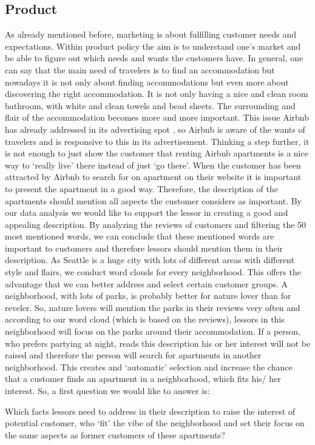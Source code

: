 \documentclass[journal]{IEEEtran}
\begin{document}
\subsection{Product}
\noindent As already mentioned before, marketing is about fulfilling customer needs and expectations. Within product policy the aim is to understand one’s market and be able to figure out which needs and wants the customers have. In general, one can say that the main need of travelers is to find an accommodation but nowadays it is not only about finding accommodations but even more about discovering the right accommodation. It is not only having a nice and clean room bathroom, with white and clean towels and bead sheets. The surrounding and flair of the accommodation becomes more and more important. This issue Airbnb has already addressed in its advertising spot \cite{RN6}, so Airbnb is aware of the wants of travelers and is responsive to this in its advertisement. Thinking a step further, it is not enough to just show the customer that renting Airbnb apartments is a nice way to ‘really live’ there instead of just ‘go there’. When the customer has been attracted by Airbnb to search for on apartment on their website it is important to present the apartment in a good way. Therefore, the description of the apartments should mention all aspects the customer considers as important. By our data analysis we would like to support the lessor in creating a good and appealing description. By analyzing the reviews of customers and filtering the 50 most mentioned words, we can conclude that these mentioned words are important to customers and therefore lessors should mention them in their description. As Seattle is a huge city with lots of different areas with different style and flairs, we conduct word clouds for every neighborhood. This offers the advantage that we can better address and select certain customer groups. A neighborhood, with lots of parks, is probably better for nature lover than for reveler. So, nature lovers will mention the parks in their reviews very often and according to our word cloud (which is based on the reviews), lessors in this neighborhood will focus on the parks around their accommodation. If a person, who prefers partying at night, reads this description his or her interest will not be raised and therefore the person will search for apartments in another neighborhood. This creates and ‘automatic’ selection and increase the chance that a customer finds an apartment in a neighborhood, which fits his/ her interest. So, a first question we would like to answer is: \begin{itshape}Which facts lessors need to address in their description to raise the interest of potential customer, who ‘fit’ the vibe of the neighborhood and set their focus on the same aspects as former customers of these apartments?\end{itshape}
\end{document}
